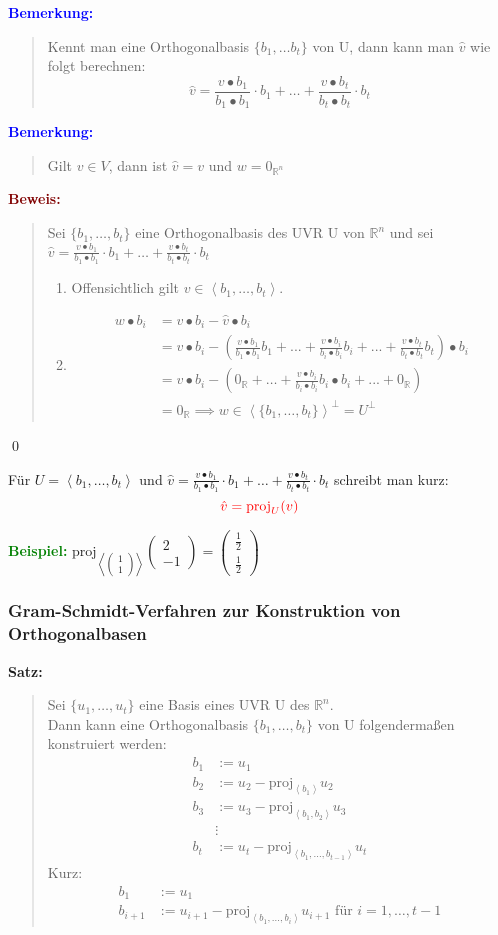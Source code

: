 \documentclass{article}
\newcommand{\red}[1]{\textcolor{red}{#1}}
\newcommand{\blue}[1]{\textcolor{blue}{#1}}
\newcommand{\green}[1]{\textcolor{green}{#1}}
\newcommand{\dgr}[1]{\textcolor{dgr}{#1}}
\newcommand{\maroon}[1]{\textcolor{maroon}{#1}}
\newcommand{\ex}{\green{\textbf{Beispiel: }}}
\newcommand{\an}[1]{\blue{\textbf{Bemerkung: }}\begin{quote}#1\end{quote}}
\newcommand{\se}[1]{\dgr{\textbf{Satz: }}\begin{quote}#1\end{quote}}
\newcommand{\pr}[1]{\maroon{\textbf{Beweis: }}\begin{quote}#1\end{quote}\qed}
\newcommand{\R}{\mathbb{R}}
\newcommand{\vvec}[2]{\begin{pmatrix}#1\\#2\end{pmatrix}}
\newcommand{\spann}[1]{\left\langle#1\right\rangle}
\newcommand{\pro}{\text{proj}}
\begin{document}
\an{
    Kennt man eine Orthogonalbasis $\{b_1, \dots b_t\}$ von U, dann kann man $\hat{v}$ wie folgt berechnen:
    \[
        \hat{v} = \frac{v \bullet b_1}{b_1 \bullet b_1} \cdot b_1 + \dots + \frac{v \bullet b_t}{b_t \bullet b_t} \cdot b_t
    \]
}
\an{
    Gilt $v \in V$, dann ist $\hat{v} = v$ und $w = 0_{\R^n}$
}
\pr{
    Sei $\{b_1, \dots, b_t\}$ eine Orthogonalbasis des UVR U von $\R^n$ und sei\\
    $\hat{v} = \frac{v \bullet b_1}{b_1 \bullet b_1} \cdot b_1 + \dots + \frac{v \bullet b_t}{b_t \bullet b_t} \cdot b_t$
    \begin{enumerate}
        \item Offensichtlich gilt $v \in \spann{b_1, \dots, b_t}$.
        \item
        \begin{align*}
            w \bullet b_i &= v \bullet b_i - \hat{v} \bullet b_i\\
            &= v \bullet b_i - (\frac{v \bullet b_1}{b_1 \bullet b_1} b_1 + ... + \frac{v \bullet b_i}{b_i \bullet b_i} b_i + ... + \frac{v \bullet b_t}{b_t \bullet b_t} b_t) \bullet b_i\\
            &= v \bullet b_i - (0_{\R} + \dots + \frac{v \bullet b_i}{b_i \bullet b_i} b_i \bullet b_i + ... + 0_{\R})\\
            &= 0_{\R} \implies w \in \spann{\{b_1, \dots, b_t\}}^{\perp} = U^{\perp}
        \end{align*}
    \end{enumerate}
}

Für $U = \spann{b_1, \dots, b_t}$ und $\hat{v} = \frac{v \bullet b_1}{b_1 \bullet b_1} \cdot b_1 + \dots + \frac{v \bullet b_t}{b_t \bullet b_t} \cdot b_t$ schreibt man kurz:
\[
    \red{\hat{v} = \pro_U(v)}
\]

\ex $\pro_{\spann{\vvec{1}{1}}}\vvec{2}{-1} = \vvec{\frac{1}{2}}{\frac{1}{2}}$

\subsubsection{Gram-Schmidt-Verfahren zur Konstruktion von Orthogonalbasen}

\se{
    Sei $\{u_1, \dots, u_t\}$ eine Basis eines UVR U des $\R^n$.\\
    Dann kann eine Orthogonalbasis $\{b_1, \dots, b_t\}$ von U folgendermaßen konstruiert werden:
    \begin{align*}
        b_1 &:= u_1\\
        b_2 &:= u_2 - \pro_{\spann{b_1}} u_2\\
        b_3 &:= u_3 - \pro_{\spann{b_1, b_2}} u_3\\
        &\vdots\\
        b_t &:= u_t - \pro_{\spann{b_1, \dots, b_{t-1}}} u_t
    \end{align*}
    Kurz:
    \begin{align*}
        b_1 &:= u_1\\
        b_{i+1} &:= u_{i+1} - \pro_{\spann{b_1, \dots, b_i}} u_{i+1} \text{ für } i = 1, \dots, t-1
    \end{align*}
}
\end{document}
